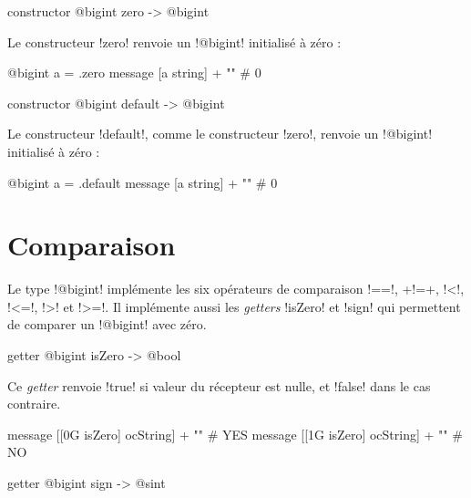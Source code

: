 
\begin{galgas}
constructor @bigint zero -> @bigint
\end{galgas}

Le constructeur \ggs!zero! renvoie un \ggs!@bigint! initialisé à zéro :
\begin{galgas}
@bigint a = .zero
message [a string] + "\n" # 0
\end{galgas}



\begin{galgas}
constructor @bigint default -> @bigint
\end{galgas}

Le constructeur \ggs!default!, comme le constructeur \ggs!zero!, renvoie un \ggs!@bigint! initialisé à zéro :
\begin{galgas}
@bigint a = .default
message [a string] + "\n" # 0
\end{galgas}











\section{Comparaison}

Le type \ggs!@bigint! implémente les six opérateurs de comparaison \ggs!==!, \ggs+!=+, \ggs!<!, \ggs!<=!, \ggs!>! et \ggs!>=!. Il  implémente aussi les \emph{getters} \ggs!isZero! et \ggs!sign! qui permettent de comparer un \ggs!@bigint! avec zéro.



\begin{galgas}
getter @bigint isZero -> @bool
\end{galgas}

Ce \emph{getter} renvoie \ggs!true! si valeur du récepteur est nulle, et \ggs!false! dans le cas contraire.

\begin{galgas}
message [[0G isZero] ocString] + "\n" # YES
message [[1G isZero] ocString] + "\n" # NO
\end{galgas}




\begin{galgas}
getter @bigint sign -> @sint
\end{galgas}


